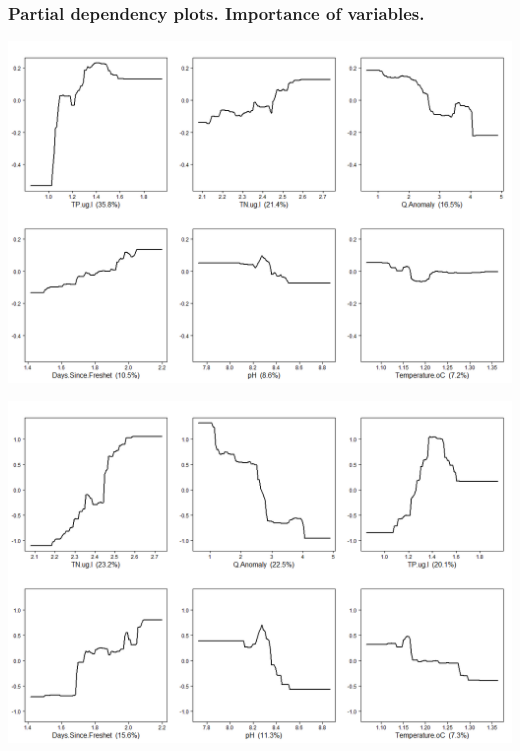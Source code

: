 \documentclass[
]{article}
\let\origfigure\figure
\let\endorigfigure\endfigure
\renewenvironment{figure}[1][2] {
    \expandafter\origfigure\expandafter[H]
} {
    \endorigfigure
}
\begin{document}
\hypertarget{partial-dependency-plots.-importance-of-variables.}{%
\subsubsection{Partial dependency plots. Importance of
variables.}\label{partial-dependency-plots.-importance-of-variables.}}

\begin{figure}
\includegraphics[width=1\linewidth]{Manuscript_files/FIGURES/Part_Dep_SS} \caption{A caption}\label{fig:unnamed-chunk-4}
\end{figure}

\begin{figure}
\includegraphics[width=1\linewidth]{Manuscript_files/FIGURES/Part_Dep_BNB} \caption{A caption}\label{fig:unnamed-chunk-5}
\end{figure}
\end{document}
